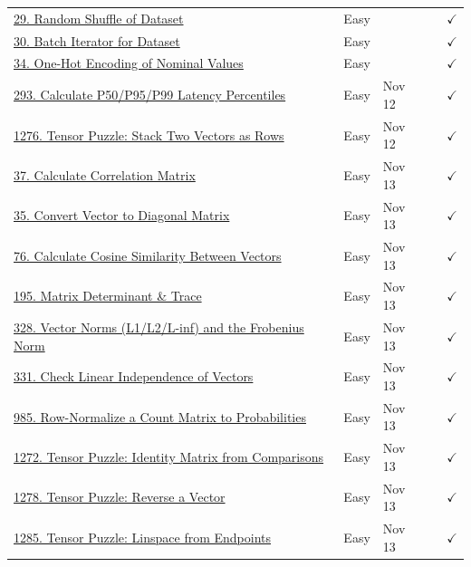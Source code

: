\documentclass{article}
\begin{document}
\begin{longtable}{p{7.5cm} l l c c}
\href{https://www.deep-ml.com/problems/29}{29. Random Shuffle of Dataset} & Easy & & & $\checkmark$ \\
\href{https://www.deep-ml.com/problems/30}{30. Batch Iterator for Dataset} & Easy & & & $\checkmark$ \\
\href{https://www.deep-ml.com/problems/34}{34. One-Hot Encoding of Nominal Values} & Easy & & & $\checkmark$ \\
\href{https://www.deep-ml.com/problems/293}{293. Calculate P50/P95/P99 Latency Percentiles} & Easy & Nov 12 & & $\checkmark$ \\
\href{https://www.deep-ml.com/problems/1276}{1276. Tensor Puzzle: Stack Two Vectors as Rows} & Easy & Nov 12 & & $\checkmark$ \\
\href{https://www.deep-ml.com/problems/37}{37. Calculate Correlation Matrix} & Easy & Nov 13 & & $\checkmark$ \\
\href{https://www.deep-ml.com/problems/35}{35. Convert Vector to Diagonal Matrix} & Easy & Nov 13 & & $\checkmark$ \\
\href{https://www.deep-ml.com/problems/76}{76. Calculate Cosine Similarity Between Vectors} & Easy & Nov 13 & & $\checkmark$ \\
\href{https://www.deep-ml.com/problems/195}{195. Matrix Determinant \& Trace} & Easy & Nov 13 & & $\checkmark$ \\
\href{https://www.deep-ml.com/problems/328}{328. Vector Norms (L1/L2/L-inf) and the Frobenius Norm} & Easy & Nov 13 & & $\checkmark$ \\
\href{https://www.deep-ml.com/problems/331}{331. Check Linear Independence of Vectors} & Easy & Nov 13 & & $\checkmark$ \\
\href{https://www.deep-ml.com/problems/985}{985. Row-Normalize a Count Matrix to Probabilities} & Easy & Nov 13 & & $\checkmark$ \\
\href{https://www.deep-ml.com/problems/1272}{1272. Tensor Puzzle: Identity Matrix from Comparisons} & Easy & Nov 13 & & $\checkmark$ \\
\href{https://www.deep-ml.com/problems/1278}{1278. Tensor Puzzle: Reverse a Vector} & Easy & Nov 13 & & $\checkmark$ \\
\href{https://www.deep-ml.com/problems/1285}{1285. Tensor Puzzle: Linspace from Endpoints} & Easy & Nov 13 & & $\checkmark$ \\


\end{longtable}
\end{document}
